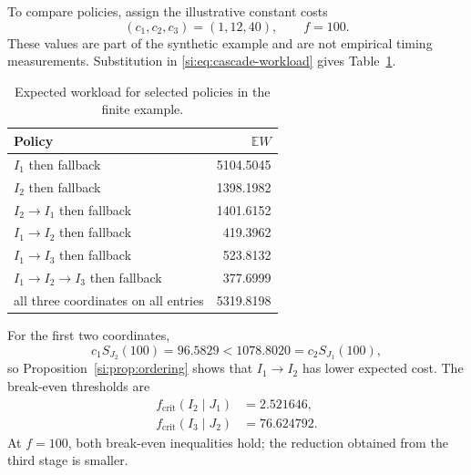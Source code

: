 \documentclass[9pt,twoside]{pnas-new}
\theoremstyle{definition}
\theoremstyle{remark}
\begin{document}
To compare policies, assign the illustrative constant costs
\[
 (c_1,c_2,c_3)=(1,12,40),
 \qquad
 f=100.
\]
These values are part of the synthetic example and are not empirical timing measurements.
Substitution in \eqref{si:eq:cascade-workload} gives Table~\ref{si:tab:cascade-costs}.

\begin{table}[ht]
\centering
\caption{Expected workload for selected policies in the finite example.}
\label{si:tab:cascade-costs}
\begin{tabular}{lr}
\toprule
Policy & $\mathbb EW$\\
\midrule
$I_1$ then fallback & 5104.5045\\
$I_2$ then fallback & 1398.1982\\
$I_2\to I_1$ then fallback & 1401.6152\\
$I_1\to I_2$ then fallback & 419.3962\\
$I_1\to I_3$ then fallback & 523.8132\\
$I_1\to I_2\to I_3$ then fallback & 377.6999\\
all three coordinates on all entries & 5319.8198\\
\bottomrule
\end{tabular}
\end{table}

For the first two coordinates,
\[
 c_1S_{J_2}(100)=96.5829
 <1078.8020=c_2S_{J_1}(100),
\]
so Proposition~\ref{si:prop:ordering} shows that $I_1\to I_2$ has lower expected cost.  The break-even thresholds are
\begin{align*}
 f_{\mathrm{crit}}(I_2\mid J_1)&=2.521646,\\
 f_{\mathrm{crit}}(I_3\mid J_2)&=76.624792.
\end{align*}
At $f=100$, both break-even inequalities hold; the reduction obtained from the third stage is smaller.
\end{document}
